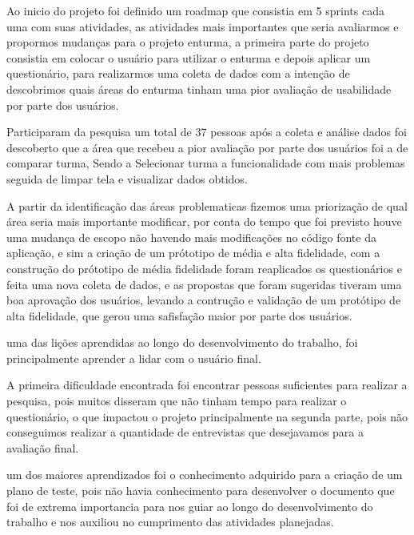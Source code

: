 
Ao inicio do projeto foi definido um roadmap que consistia em 5 sprints cada uma com suas atividades, as atividades mais importantes que seria avaliarmos e propormos mudanças para o projeto enturma, a primeira parte do projeto consistia em colocar o usuário para utilizar o enturma e depois aplicar um questionário, para realizarmos uma coleta de dados com a intenção de descobrimos quais áreas do enturma tinham uma pior avaliação de usabilidade por parte dos usuários.

	Participaram da pesquisa um total de 37 pessoas após a coleta e análise dados foi descoberto que a área que recebeu a pior avaliação por parte dos usuários foi a de comparar turma, Sendo a Selecionar turma a funcionalidade com mais problemas seguida de limpar tela e visualizar dados obtidos.

	A partir da identificação das áreas problematicas fizemos uma priorização de qual área seria mais importante modificar, por conta do tempo que foi previsto houve uma mudança de escopo não havendo mais modificações no código fonte da aplicação, e sim a criação de um prótotipo de média e alta fidelidade, com a construção do prótotipo de média fidelidade foram reaplicados os questionários e feita uma nova coleta de dados, e as propostas que foram sugeridas tiveram uma boa aprovação dos usuários, levando a contrução e validação de um protótipo de alta fidelidade, que gerou uma safisfação maior por parte dos usuários.

uma das lições aprendidas ao longo do desenvolvimento do trabalho, foi principalmente aprender a lidar com o usuário final.

	A primeira dificuldade encontrada foi encontrar pessoas suficientes para realizar a pesquisa, pois muitos disseram que não tinham tempo para realizar o questionário, o que impactou o projeto principalmente na segunda parte, pois não conseguimos realizar a quantidade de entrevistas que desejavamos para a avaliação final.

		um dos maiores aprendizados foi o conhecimento adquirido para a criação de um plano de teste, pois não havia conhecimento para desenvolver o documento que foi de extrema importancia para nos guiar ao longo do desenvolvimento do trabalho e nos auxiliou no cumprimento das atividades planejadas.



	